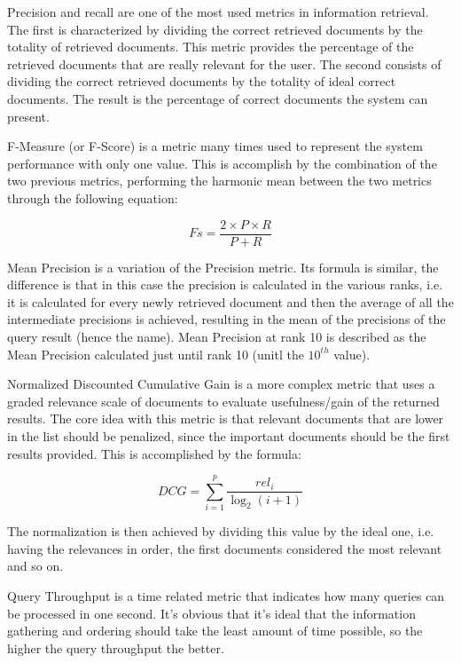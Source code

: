 \documentclass[12pt]{article}
\begin{document}
Precision and recall are one of the most used metrics in information retrieval.
The first is characterized by dividing the correct retrieved documents by the 
totality of retrieved documents. 
This metric provides the percentage of the retrieved documents that are really 
relevant for the user.
The second consists of dividing the correct retrieved documents by the totality 
of ideal correct documents. 
The result is the percentage of correct documents the system can present.

F-Measure (or F-Score) is a metric many times used to represent the system 
performance with only one value. 
This is accomplish by the combination of the two previous metrics, performing 
the harmonic mean between the two metrics through the following equation:

\begin{equation}
  Fs = \frac{2 \times P \times R}{P + R}
\end{equation}

Mean Precision is a variation of the Precision metric. 
Its formula is similar, the difference is that in this case the precision 
is calculated in the various ranks, i.e. it is calculated for every newly 
retrieved document and then the average of all the intermediate precisions 
is achieved, resulting in the mean of the precisions of the query result
(hence the name).
Mean Precision at rank 10 is described as the Mean Precision calculated just 
until rank 10 (unitl the $10^{th}$ value).

Normalized Discounted Cumulative Gain is a more complex metric that uses a graded 
relevance scale of documents to evaluate usefulness/gain of the returned results. 
The core idea with this metric is that relevant documents that are lower in the 
list should be penalized, since the important documents should be the first 
results provided. 
This is accomplished by the formula:

\begin{equation}
  DCG = \sum_{i=1}^{p} \frac{rel_{i}}{\log_{2}(i+1)}
\end{equation}

The normalization is then achieved by dividing this value by the ideal one, i.e.
having the relevances in order, the first documents considered the most relevant 
and so on.

Query Throughput is a time related metric that indicates how many queries can be 
processed in one second. 
It's obvious that it's ideal that the information gathering and ordering should 
take the least amount of time possible, so the higher the query throughput the better.
\end{document}
